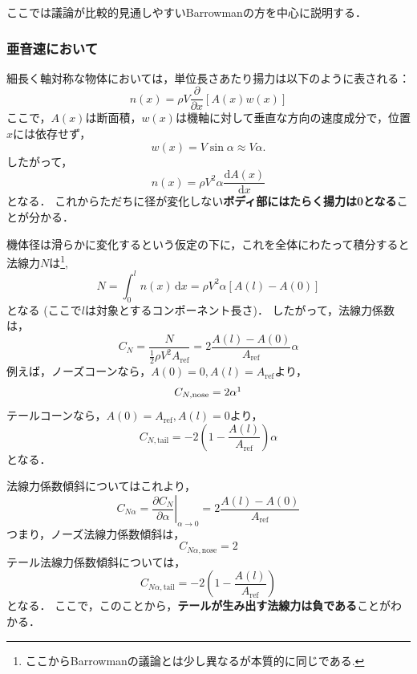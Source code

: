 \documentclass[uplatex,dvipdfmx,a4j,11pt]{jsarticle}
\newcommand{\diff}{\mathrm{d}} %
\begin{document}
ここでは議論が比較的見通しやすいBarrowmanの方を中心に説明する．

\subsubsection{亜音速において}
細長く軸対称な物体においては，単位長さあたり揚力は以下のように表される：
\begin{equation}
  n(x) = \rho V \frac{\partial}{\partial x} \left[A(x)w(x)\right]
  \tag{B.3.57}
  \label{eq:barrowman_lift}
\end{equation}
ここで，$A(x)$は断面積，$w(x)$は機軸に対して垂直な方向の速度成分で，位置$x$には依存せず，
\begin{equation*}
  w(x) = V \sin\alpha \approx V\alpha.
\end{equation*}
したがって，
\begin{equation}
  n(x) = \rho V^2 \alpha \frac{\diff A(x)}{\diff x}
  \tag{B.3.59}
\end{equation} 
となる．
これからただちに径が変化しない\textbf{ボディ部にはたらく揚力は0となる}ことが分かる．

機体径は滑らかに変化するという仮定の下に，これを全体にわたって積分すると法線力$N$は\footnote{ここからBarrowmanの議論とは少し異なるが本質的に同じである.},
\begin{equation}
  N = \int_0^{l } n(x) \,\diff x =  \rho V^2 \alpha [A(l) - A(0)]
\end{equation}
となる (ここで$l$は対象とするコンポーネント長さ)．
したがって，法線力係数は，
\begin{equation}
  C_{N} = \frac{N}{\frac{1}{2}\rho V^2 A_\mathrm{ref}} = 2\frac{A(l) - A(0)}{A_\mathrm{ref}} \alpha
\end{equation}
例えば，ノーズコーンなら，$A(0) = 0, A(l) = A_\mathrm{ref}$より，
\begin{equation}
  C_{N, \mathrm{nose}} = 2\alpha\footnotemark
\end{equation}
テールコーンなら，$A(0) = A_\mathrm{ref}, A(l) = 0$より，
\begin{equation}
  C_{N, \mathrm{tail}} = - 2 \left(1 - \frac{A(l)}{A_\mathrm{ref}}\right) \alpha
\end{equation}
となる．

法線力係数傾斜についてはこれより，
\begin{equation}
  C_{N\alpha} = \left.\frac{\partial C_{N}}{\partial \alpha}\right|_{\alpha \to 0} = 2\frac{A(l) - A(0)}{A_\mathrm{ref}}
  \tag{B.3.65}
\end{equation}
つまり，ノーズ法線力係数傾斜は，
\begin{equation}
  C_{N\alpha, \mathrm{nose}}  = 2
\end{equation}
テール法線力係数傾斜については，
\begin{equation}
  C_{N\alpha, \mathrm{tail}} = - 2 \left(1 - \frac{A(l)}{A_\mathrm{ref}}\right)
\end{equation}
となる．
ここで，このことから，\textbf{テールが生み出す法線力は負である}ことがわかる．
\end{document}
